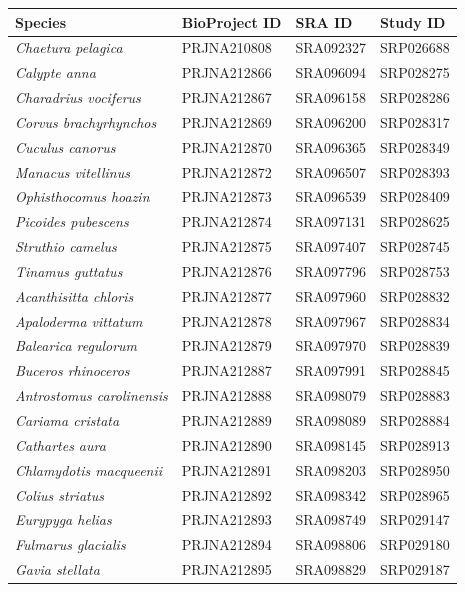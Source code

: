 \documentclass[10pt]{bmc_article}
\newenvironment{bmcformat}{\begin{raggedright}\baselineskip20pt\sloppy\setboolean{publ}{false}}{\end{raggedright}\baselineskip20pt\sloppy}
\begin{document}
\begin{bmcformat}
\begin{table}[h!]
  \begin{center}
    \begin{tabular}{|l|l|l|l|}
    \hline
Species & BioProject ID & SRA ID & Study ID \\
    \hline
\emph{Chaetura pelagica} & PRJNA210808  & SRA092327 & SRP026688\\
\emph{Calypte anna} & PRJNA212866 & SRA096094 & SRP028275\\
\emph{Charadrius vociferus} & PRJNA212867 & SRA096158 & SRP028286\\
\emph{Corvus brachyrhynchos} & PRJNA212869 & SRA096200 & SRP028317\\
\emph{Cuculus canorus} & PRJNA212870 & SRA096365 & SRP028349\\
\emph{Manacus vitellinus} & PRJNA212872 & SRA096507 & SRP028393\\
\emph{Ophisthocomus hoazin} & PRJNA212873 & SRA096539 & SRP028409\\
\emph{Picoides pubescens} & PRJNA212874 & SRA097131 & SRP028625\\
\emph{Struthio camelus} & PRJNA212875 & SRA097407 & SRP028745\\
\emph{Tinamus guttatus} & PRJNA212876 & SRA097796 & SRP028753\\
\emph{Acanthisitta chloris} & PRJNA212877 & SRA097960 & SRP028832\\
\emph{Apaloderma vittatum} & PRJNA212878 & SRA097967 & SRP028834\\
\emph{Balearica regulorum} & PRJNA212879 & SRA097970 & SRP028839\\
\emph{Buceros rhinoceros} & PRJNA212887 & SRA097991 & SRP028845\\
\emph{Antrostomus carolinensis} & PRJNA212888 & SRA098079 & SRP028883\\
\emph{Cariama cristata} & PRJNA212889 & SRA098089 & SRP028884\\
\emph{Cathartes aura} & PRJNA212890 & SRA098145 & SRP028913\\
\emph{Chlamydotis macqueenii} & PRJNA212891 & SRA098203 & SRP028950\\
\emph{Colius striatus} & PRJNA212892 & SRA098342 & SRP028965\\
\emph{Eurypyga helias} & PRJNA212893 & SRA098749 & SRP029147\\
\emph{Fulmarus glacialis} & PRJNA212894 & SRA098806 & SRP029180\\
\emph{Gavia stellata} & PRJNA212895 & SRA098829 & SRP029187\\

\end{tabular}
\end{center}
\end{table}
\end{bmcformat}
\end{document}
